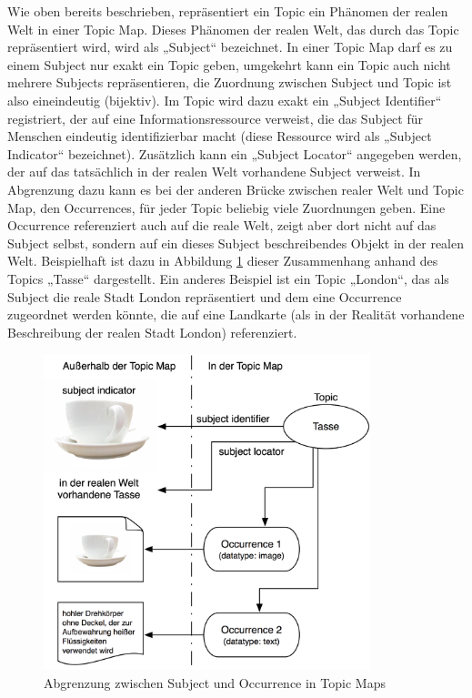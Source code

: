 Wie oben bereits beschrieben, repräsentiert ein Topic ein Phänomen der realen Welt in einer Topic Map. Dieses Phänomen der realen Welt, das durch das Topic repräsentiert wird, wird als „Subject“ bezeichnet. In einer Topic Map darf es zu einem Subject nur exakt ein Topic geben, umgekehrt kann ein Topic auch nicht mehrere Subjects repräsentieren, die Zuordnung zwischen Subject und Topic ist also eineindeutig (bijektiv). Im Topic wird dazu exakt ein „Subject Identifier“ registriert, der auf eine Informationsressource verweist, die das Subject für Menschen eindeutig identifizierbar macht (diese Ressource wird als „Subject Indicator“ bezeichnet). Zusätzlich kann ein „Subject Locator“ angegeben werden, der auf das tatsächlich in der realen Welt vorhandene Subject verweist. In Abgrenzung dazu kann es bei der anderen Brücke zwischen realer Welt und Topic Map, den Occurrences, für jeder Topic beliebig viele Zuordnungen geben. Eine Occurrence referenziert auch auf die reale Welt, zeigt aber dort nicht auf das Subject selbst, sondern auf ein dieses Subject beschreibendes Objekt in der realen Welt. Beispielhaft ist dazu in Abbildung \ref{fig:img_Persistenz_SubjectVsOccurrence} dieser Zusammenhang anhand des Topics „Tasse“ dargestellt. Ein anderes Beispiel ist ein Topic „London“, das als Subject die reale Stadt London repräsentiert und dem eine Occurrence zugeordnet werden könnte, die auf eine Landkarte (als in der Realität vorhandene Beschreibung der realen Stadt London) referenziert.

\begin{figure}[htbp]
	\centering
		\includegraphics[width=9.5cm]{img/Persistenz/SubjectVsOccurrence.png}
	\caption{Abgrenzung zwischen Subject und Occurrence in Topic Maps}
	\label{fig:img_Persistenz_SubjectVsOccurrence}
\end{figure}

